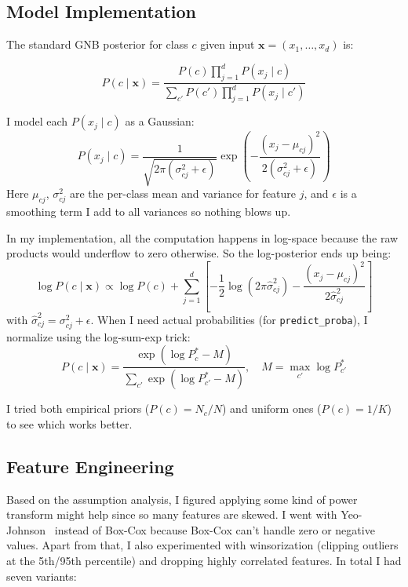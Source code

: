 \documentclass[journal,onecolumn]{IEEEtran}
\begin{document}
\subsection{Model Implementation}

The standard GNB posterior for class $c$ given input $\mathbf{x} = (x_1, \ldots, x_d)$ is:

\begin{equation}
    P(c \mid \mathbf{x}) = \frac{P(c) \prod_{j=1}^{d} P(x_j \mid c)}{\sum_{c'} P(c') \prod_{j=1}^{d} P(x_j \mid c')}
\end{equation}

I model each $P(x_j \mid c)$ as a Gaussian:
\begin{equation}
    P(x_j \mid c) = \frac{1}{\sqrt{2\pi(\sigma_{cj}^2 + \epsilon)}} \exp\left(-\frac{(x_j - \mu_{cj})^2}{2(\sigma_{cj}^2 + \epsilon)}\right)
\end{equation}
Here $\mu_{cj}$, $\sigma_{cj}^2$ are the per-class mean and variance for feature $j$, and $\epsilon$ is a smoothing term I add to all variances so nothing blows up.

In my implementation, all the computation happens in log-space because the raw products would underflow to zero otherwise. So the log-posterior ends up being:
\begin{equation}
    \log P(c \mid \mathbf{x}) \propto \log P(c) + \sum_{j=1}^{d} \left[ -\frac{1}{2}\log(2\pi\hat{\sigma}_{cj}^2) - \frac{(x_j - \mu_{cj})^2}{2\hat{\sigma}_{cj}^2} \right]
\end{equation}
with $\hat{\sigma}_{cj}^2 = \sigma_{cj}^2 + \epsilon$. When I need actual probabilities (for \texttt{predict\_proba}), I normalize using the log-sum-exp trick:
\begin{equation}
    P(c \mid \mathbf{x}) = \frac{\exp(\log P_c^* - M)}{\sum_{c'}\exp(\log P_{c'}^* - M)}, \quad M = \max_{c'} \log P_{c'}^*
\end{equation}

I tried both empirical priors ($P(c) = N_c / N$) and uniform ones ($P(c) = 1/K$) to see which works better.

\subsection{Feature Engineering}
\label{sec:feature_eng}

Based on the assumption analysis, I figured applying some kind of power transform might help since so many features are skewed. I went with Yeo-Johnson~\cite{yeo2000} instead of Box-Cox because Box-Cox can't handle zero or negative values. Apart from that, I also experimented with winsorization (clipping outliers at the 5th/95th percentile) and dropping highly correlated features. In total I had seven variants:
\end{document}
